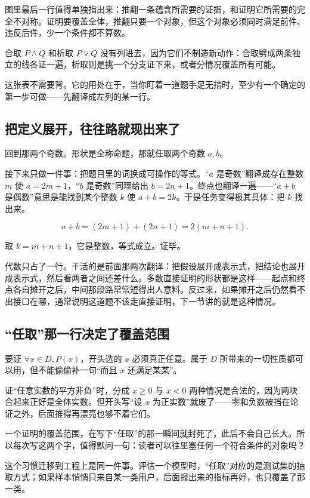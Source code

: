 图里最后一行值得单独指出来：推翻一条蕴含所需要的证据，和证明它所需要的完全不对称。证明要覆盖全体，推翻只要一个对象，但这个对象必须同时满足前件、违反后件，少一个条件都不算数。

合取 \(P\land Q\) 和析取 \(P\lor Q\) 没有列进去，因为它们不制造新动作：合取劈成两条独立的线各证一遍，析取则是挑一个分支证下来，或者分情况覆盖所有可能。

这张表不需要背。它的用处在于，当你盯着一道题手足无措时，至少有一个确定的第一步可做——先翻译成左列的某一行。

\subsection{把定义展开，往往路就现出来了}

回到那两个奇数。形状是全称命题，那就任取两个奇数 \(a,b\)。

接下来只做一件事：把题目里的词换成可操作的等式。``\(a\) 是奇数''翻译成存在整数 \(m\) 使 \(a=2m+1\)，``\(b\) 是奇数''同理给出 \(b=2n+1\)。终点也翻译一遍——``\(a+b\) 是偶数''意思是能找到某个整数 \(k\) 使 \(a+b=2k\)。于是任务变得极其具体：把 \(k\) 找出来。

\[
a+b=(2m+1)+(2n+1)=2(m+n+1).
\]

取 \(k=m+n+1\)，它是整数，等式成立。证毕。

代数只占了一行。干活的是前面那两次翻译：把假设展开成表示式，把结论也展开成表示式，然后看两者之间还差什么。多数直接证明的形状都是这样——起点和终点各自摊开之后，中间那段路常常短得出人意料。反过来，如果摊开之后仍然看不出接口在哪，通常说明这道题不该走直接证明，下一节讲的就是这种情况。

\subsection{``任取''那一行决定了覆盖范围}

要证 \(\forall x\in D,P(x)\)，开头选的 \(x\) 必须真正任意。属于 \(D\) 所带来的一切性质都可以用，但不能偷偷补一句``而且 \(x\) 还满足某某''。

证``任意实数的平方非负''时，分成 \(x\ge0\) 与 \(x<0\) 两种情况是合法的，因为两块合起来正好是全体实数。但开头写``设 \(x\) 为正实数''就废了——零和负数被挡在论证之外，后面推得再漂亮也够不着它们。

一个证明的覆盖范围，在写下``任取''的那一瞬间就封死了，此后不会自己长大。所以每次写这两个字，值得默问一句：读者可以往里塞任何一个符合条件的对象吗？

这个习惯迁移到工程上是同一件事。评估一个模型时，``任取''对应的是测试集的抽取方式；如果样本悄悄只来自某一类用户，后面报出来的指标再好，也只覆盖了那一类。

